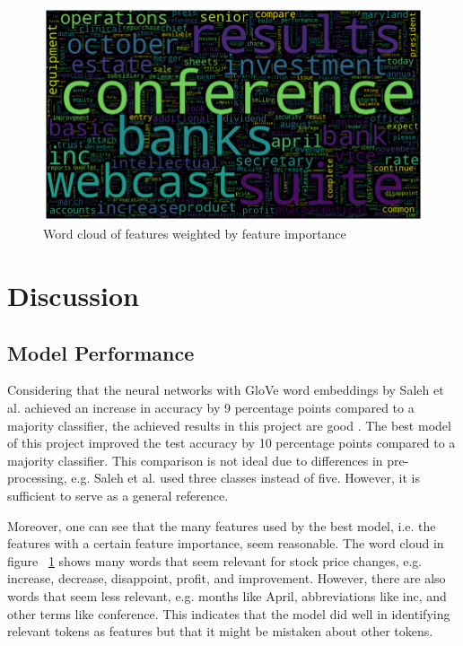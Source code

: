 \documentclass{article}
\begin{document}
	\begin{figure}[h!]
		\includegraphics[width=\linewidth]{img/feat_imp.png}
		\caption{Word cloud of features weighted by feature importance}
		\label{fig:feat_imp}
	\end{figure}
	
	
	\section{Discussion}
	
	\subsection{Model Performance}
	
	Considering that the neural networks with GloVe word embeddings by Saleh et al. achieved an increase in accuracy by 9 percentage points compared to a majority classifier, the achieved results in this project are good \cite{lee_importance_2014}. The best model of this project improved the test accuracy by 10 percentage points compared to a majority classifier. This comparison is not ideal due to differences in pre-processing, e.g.  Saleh et al. used three classes instead of five. However, it is sufficient to serve as a general reference. 
	
	Moreover, one can see that the many features used by the best model, i.e. the features with a certain feature importance, seem reasonable. The word cloud in figure ~\ref{fig:feat_imp} shows many words that seem relevant for stock price changes, e.g. increase, decrease, disappoint, profit, and improvement. However, there are also words that seem less relevant, e.g. months like April, abbreviations like inc, and other terms like conference. This indicates that the model did well in identifying relevant tokens as features but that it might be mistaken about other tokens.
	
\end{document}
